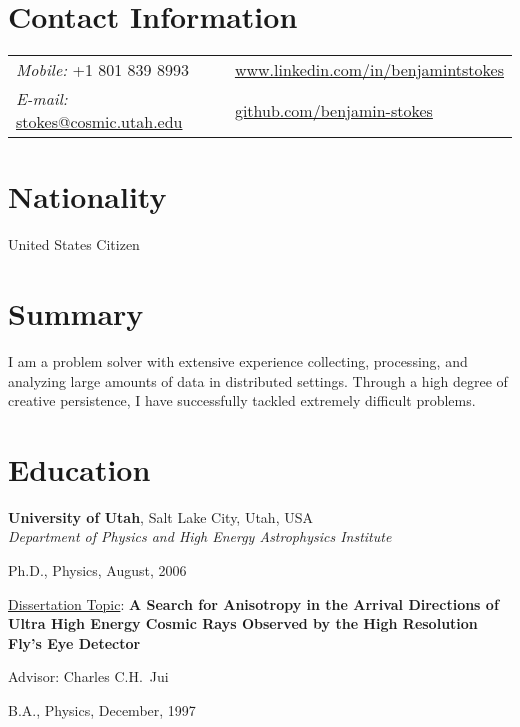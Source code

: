 \begin{resume}
\section{\sc Contact Information}
\vspace{.05in}
\begin{tabular}{@{}p{2.5in}p{2.5in}}
{\it Mobile:}  +1 801 839 8993 & \href{http://www.linkedin.com/in/benjamintstokes}{www.linkedin.com/in/benjamintstokes}\\
{\it E-mail:}  \href{mailto:stokes@cosmic.utah.edu}{stokes@cosmic.utah.edu} & \href{https://github.com/benjamin-stokes}{github.com/benjamin-stokes}\\

\end{tabular}

\section{\sc Nationality}
United States Citizen

\section{\sc Summary}
I am a problem solver with extensive experience collecting, processing, and analyzing large amounts of data in distributed settings.  Through a high degree of creative persistence, I have successfully tackled extremely difficult problems.

\section{\sc Education}
{\bf University of Utah}, Salt Lake City, Utah, USA\\
{\em Department of Physics and High Energy Astrophysics Institute}
\begin{list1}
\item[] Ph.D., Physics, August, 2006
\begin{list2}
\item \href{http://www.cosmic-ray.org/thesis/stokes.html}{Dissertation Topic}: {\bf A Search for Anisotropy in the Arrival Directions of Ultra High Energy Cosmic Rays Observed by the High Resolution Fly's Eye Detector}
\item Advisor:  Charles C.H.\ Jui
\end{list2}
\item[] B.A., Physics, December, 1997
\end{list1}
\vspace*{.05in}


\end{resume}
